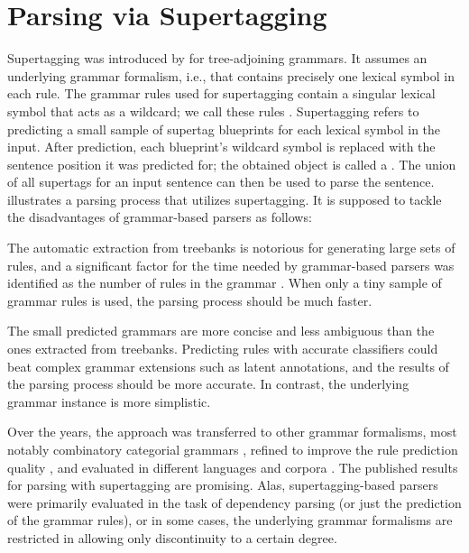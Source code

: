 \documentclass[../document.tex]{subfiles}
\begin{document}
    \section*{Parsing via Supertagging}
    Supertagging was introduced by \citet{bangalore1999supertagging} for tree-adjoining grammars.
    It assumes an underlying  grammar formalism, i.e.\@, that contains precisely one lexical symbol in each rule.
    The grammar rules used for supertagging contain a singular lexical symbol that acts as a wildcard; we call these rules .
    Supertagging refers to predicting a small sample of supertag blueprints for each lexical symbol in the input.
    After prediction, each blueprint's wildcard symbol is replaced with the sentence position it was predicted for; the obtained object is called a .
    The union of all supertags for an input sentence can then be used to parse the sentence.
     illustrates a parsing process that utilizes supertagging.
    It is supposed to tackle the disadvantages of grammar-based parsers as follows:
    \begin{compactitem}
        \item The automatic extraction from treebanks is notorious for generating large sets of rules, and a significant factor for the time needed by grammar-based parsers was identified as the number of rules in the grammar \citep{dunlop2010reducing}.
            When only a tiny sample of grammar rules is used, the parsing process should be much faster.
        \item The small predicted grammars are more concise and less ambiguous than the ones extracted from treebanks.
            Predicting rules with accurate classifiers could beat complex grammar extensions such as latent annotations, and the results of the parsing process should be more accurate. In contrast, the underlying grammar instance is more simplistic.
    \end{compactitem}
    Over the years, the approach was transferred to other grammar formalisms, most notably combinatory categorial grammars \citep{Clark04}, refined to improve the rule prediction quality \citep{vaswani2016supertagging,Kad18,tian20}, and evaluated in different languages and corpora \citep{Bla18}.
    The published results for parsing with supertagging are promising.
    Alas, supertagging-based parsers were primarily evaluated in the task of dependency parsing (or just the prediction of the grammar rules), or in some cases, the underlying grammar formalisms are restricted in allowing only discontinuity to a certain degree.
\end{document}
